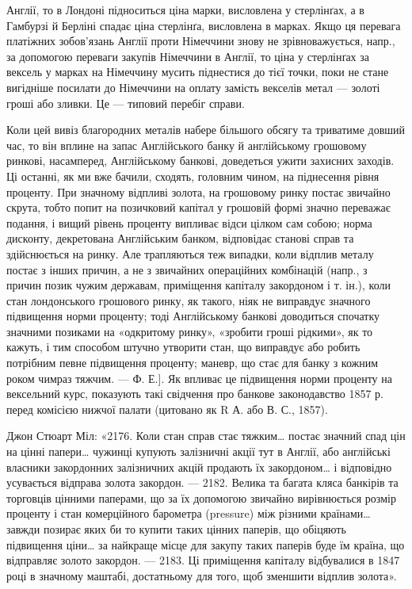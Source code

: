 \parcont{}  %
Англії, то в Лондоні підноситься ціна марки, висловлена у стерлінґах, а в Гамбурзі
й Берліні спадає ціна стерлінґа, висловлена в марках. Якщо ця перевага
платіжних зобов’язань Англії проти Німеччини знову не зрівноважується, напр.,
за допомогою переваги закупів Німеччини в Англії, то ціна у стерлінґах за
вексель у марках на Німеччину мусить піднестися до тієї точки, поки не стане
вигідніше посилати до Німеччини на оплату замість векселів метал — золоті гроші
або зливки. Це — типовий перебіг справи.

Коли цей вивіз благородних металів набере більшого обсягу та триватиме
довший час, то він вплине на запас Англійського банку й англійському грошовому
ринкові, насамперед, Англійському банкові, доведеться ужити захисних заходів.
Ці останні, як ми вже бачили, сходять, головним чином, на піднесення
рівня проценту. При значному відпливі золота, на грошовому ринку постає звичайно
скрута, тобто попит на позичковий капітал у грошовій формі значно
переважає подання, і вищий рівень проценту випливає відси цілком сам собою;
норма дисконту, декретована Англійським банком, відповідає станові справ та
здійснюється на ринку. Але трапляються теж випадки, коли відплив металу
постає з інших причин, а не з звичайних операційних комбінацій (напр., з причин
позик чужим державам, приміщення капіталу закордоном і т. ін.), коли стан
лондонського грошового ринку, як такого, ніяк не виправдує значного підвищення
норми проценту; тоді Англійському банкові доводиться спочатку значними
позиками на «одкритому ринку», «зробити гроші рідкими», як то кажуть, і тим
способом штучно утворити стан, що виправдує або робить потрібним певне підвищення
проценту; маневр, що стає для банку з кожним роком чимраз тяжчим. —
Ф. Е.]. Як впливає це підвищення норми проценту на вексельний курс, показують
такі свідчення про банкове законодавство 1857 р. перед комісією нижчої
палати (цитовано як R А. або В. С., 1857).

Джон Стюарт Міл: «2176. Коли стан справ стає тяжким\dots{} постає значний
спад цін на цінні папери\dots{} чужинці купують залізничні акції тут в Англії,
або англійські власники закордонних залізничних акцій продають їх закордоном\dots{}
і відповідно усувається відправа золота закордон. — 2182. Велика та багата
кляса банкірів та торговців цінними паперами, що за їх допомогою звичайно
вирівнюється розмір проценту і стан комерційного барометра (pressure) між
різними країнами\dots{} завжди позирає яких би то купити таких цінних паперів,
що обіцяють підвищення ціни\dots{} за найкраще місце для закупу таких
паперів буде їм країна, що відправляє золото закордон. — 2183. Ці приміщення
капіталу відбувалися в 1847 році в значному маштабі, достатньому для того, щоб
зменшити відплив золота».

